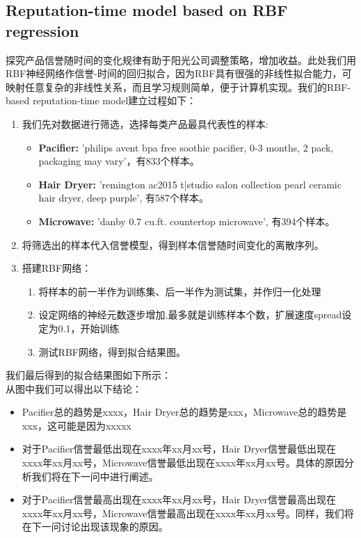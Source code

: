 \documentclass{mcmthesis}
\begin{document}
\subsection{Reputation-time model based on RBF regression}
探究产品信誉随时间的变化规律有助于阳光公司调整策略，增加收益。此处我们用RBF神经网络作信誉-时间的回归拟合，因为RBF具有很强的非线性拟合能力，可映射任意复杂的非线性关系，而且学习规则简单，便于计算机实现。我们的RBF-based reputation-time model建立过程如下：
\begin{enumerate}
	\item 我们先对数据进行筛选，选择每类产品最具代表性的样本:
	\begin{itemize}
		\item \textbf{Pacifier: }'philips avent bpa free soothie pacifier, 0-3 months, 2 pack, packaging may vary'，有833个样本。
		\item \textbf{Hair Dryer: }'remington ac2015 t|studio salon collection pearl ceramic hair dryer, deep purple', 有587个样本。
		\item \textbf{Microwave: }'danby 0.7 cu.ft. countertop microwave', 有394个样本。
	\end{itemize}
	\item 将筛选出的样本代入信誉模型，得到样本信誉随时间变化的离散序列。
	\item 搭建RBF网络：
	\begin{enumerate}
		\item 将样本的前一半作为训练集、后一半作为测试集，并作归一化处理
		\item 设定网络的神经元数逐步增加,最多就是训练样本个数，扩展速度spread设定为0.1，开始训练
		\item 测试RBF网络，得到拟合结果图。
	\end{enumerate}
\end{enumerate}
我们最后得到的拟合结果图如下所示：\\

从图中我们可以得出以下结论：
\begin{itemize}
	\item Pacifier总的趋势是xxxx，Hair Dryer总的趋势是xxx，Microwave总的趋势是xxx，这可能是因为xxxxx
	\item 对于Pacifier信誉最低出现在xxxx年xx月xx号，Hair Dryer信誉最低出现在xxxx年xx月xx号，Microwave信誉最低出现在xxxx年xx月xx号。具体的原因分析我们将在下一问中进行阐述。
	\item 对于Pacifier信誉最高出现在xxxx年xx月xx号，Hair Dryer信誉最高出现在xxxx年xx月xx号，Microwave信誉最高出现在xxxx年xx月xx号。同样，我们将在下一问讨论出现该现象的原因。
\end{itemize}
\end{document}
